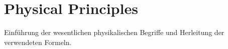 \section{Physical Principles}
Einführung der wesentlichen physikalischen Begriffe und Herleitung der verwendeten Formeln.